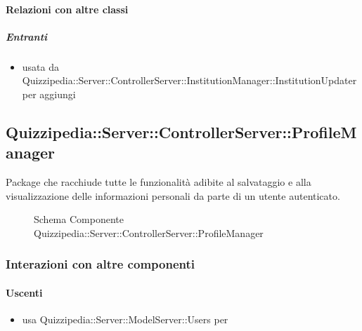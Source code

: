 \paragraph{Relazioni con altre classi}
\subparagraph{Entranti}
\begin{itemize}
\item usata da Quizzipedia::Server::ControllerServer::InstitutionManager::InstitutionUpdater per aggiungi
\end{itemize}
\subsection{Quizzipedia::Server::ControllerServer::ProfileManager}
Package che racchiude tutte le funzionalità adibite al salvataggio e alla visualizzazione delle informazioni personali da parte di un utente autenticato.
\begin{figure}[H]
\centering
\noindent{}
\caption[Schema Componente Quizzipedia::Server::ControllerServer::ProfileManager]{Schema Componente Quizzipedia::Server::ControllerServer::ProfileManager}
\end{figure}
\subsubsection{Interazioni con altre componenti}
\paragraph{Uscenti}
\begin{itemize}
\item usa Quizzipedia::Server::ModelServer::Users per 
\end{itemize}
